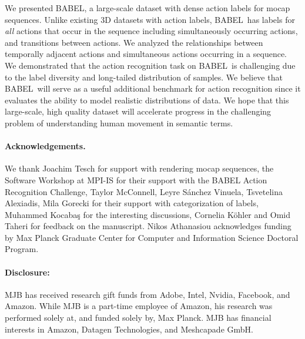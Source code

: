 \documentclass[final]{cvpr}
\def\babel{BABEL}
\begin{document}
We presented \babel, a large-scale dataset with dense action labels for mocap sequences. 
Unlike existing 3D datasets with action labels, \babel~has labels for \emph{all} actions that occur in the sequence including simultaneously occurring actions, and transitions between actions. 
We analyzed the relationships between temporally adjacent actions and simultaneous actions occurring in a sequence. 
We demonstrated that the action recognition task on \babel~is challenging due to the label diversity and long-tailed distribution of samples. We believe that \babel~will serve as a useful additional benchmark for action recognition since it evaluates the ability to model realistic distributions of data. 
We hope that this large-scale, high quality dataset will accelerate progress in the challenging problem of understanding human movement in semantic terms. 

\paragraph{Acknowledgements.} We thank Joachim Tesch for support with rendering mocap sequences, the Software Workshop at MPI-IS for their support with the BABEL Action Recognition Challenge, Taylor McConnell, Leyre Sánchez Vinuela, Tsvetelina Alexiadis, Mila Gorecki for their support with categorization of labels, Muhammed Kocabaş for the interesting discussions, Cornelia Köhler and Omid Taheri for feedback on the manuscript. Nikos Athanasiou acknowledges funding by Max Planck Graduate Center for Computer and Information Science Doctoral Program.

\paragraph{Disclosure:} 
MJB has received research gift funds from Adobe, Intel, Nvidia, Facebook, and Amazon. While MJB is a part-time employee of Amazon, his research was performed solely at, and funded solely by, Max Planck. MJB has financial interests in Amazon, Datagen Technologies, and Meshcapade GmbH.
 
{\small

\balance

}
\end{document}
